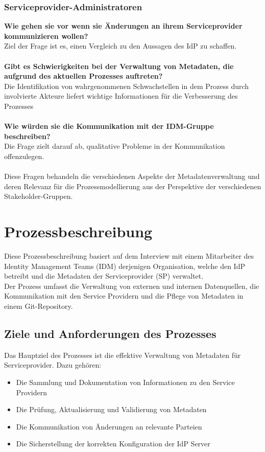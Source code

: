 \documentclass[a4paper, fontsize=11pt]{scrartcl}
\begin{document}
\subsubsection{Serviceprovider-Administratoren}
\textbf{Wie gehen sie vor wenn sie Änderungen an ihrem Serviceprovider kommunizieren wollen?}\\
Ziel der Frage ist es, einen Vergleich zu den Aussagen des IdP zu schaffen.\\\\
\textbf{Gibt es Schwierigkeiten bei der Verwaltung von Metadaten, die aufgrund des aktuellen Prozesses auftreten?}\\
Die Identifikation von wahrgenommenen Schwachstellen in dem Prozess durch involvierte Akteure liefert wichtige Informationen für die Verbesserung des Prozesses\\\\
\textbf{Wie würden sie die Kommunikation mit der IDM-Gruppe beschreiben?}\\
Die Frage zielt darauf ab, qualitative Probleme in der Kommunikation offenzulegen.\\\\


Diese Fragen behandeln die verschiedenen Aspekte der Metadatenverwaltung und deren Relevanz für die Prozessmodellierung aus der Perspektive der verschiedenen Stakeholder-Gruppen.

\section{Prozessbeschreibung}

Diese Prozessbeschreibung basiert auf dem Interview mit einem Mitarbeiter des Identity Management Teams (IDM) derjenigen Organisation, welche den IdP betreibt und die Metadaten der Serviceprovider (SP) verwaltet.\\
Der Prozess umfasst die Verwaltung von externen und internen Datenquellen, die Kommunikation mit den Service Providern und die Pflege von Metadaten in einem Git-Repository.

\subsection{Ziele und Anforderungen des Prozesses}

Das Hauptziel des Prozesses ist die effektive Verwaltung von Metadaten für Serviceprovider. Dazu gehören:

\begin{itemize}
  \item Die Sammlung und Dokumentation von Informationen zu den Service Providern
  \item Die Prüfung, Aktualisierung und Validierung von Metadaten
  \item Die Kommunikation von Änderungen an relevante Parteien
  \item Die Sicherstellung der korrekten Konfiguration der IdP Server
\end{itemize}
\end{document}
